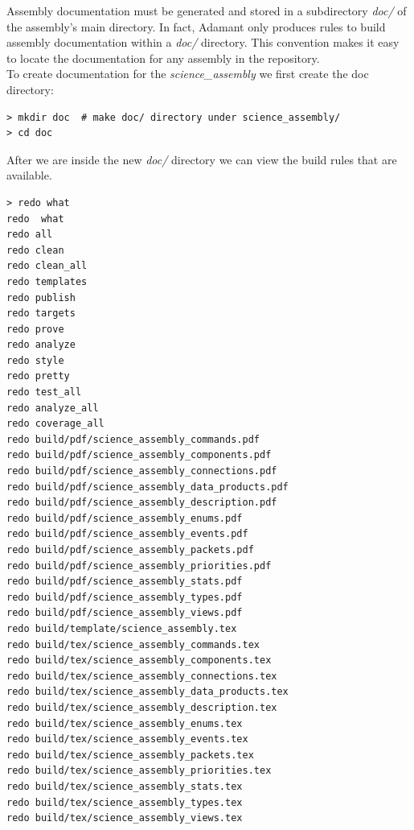 Assembly documentation must be generated and stored in a subdirectory \textit{doc/} of the assembly's main directory. In fact, Adamant only produces rules to build assembly documentation within a \textit{doc/} directory. This convention makes it easy to locate the documentation for any assembly in the repository. \\

To create documentation for the \textit{science\_assembly} we first create the doc directory:

\vspace{5mm} %
\begin{verbatim}
> mkdir doc  # make doc/ directory under science_assembly/
> cd doc
\end{verbatim}
\vspace{5mm} %

After we are inside the new \textit{doc/} directory we can view the build rules that are available.

\vspace{5mm} %
\begin{verbatim}
> redo what
redo  what
redo all
redo clean
redo clean_all
redo templates
redo publish
redo targets
redo prove
redo analyze
redo style
redo pretty
redo test_all
redo analyze_all
redo coverage_all
redo build/pdf/science_assembly_commands.pdf
redo build/pdf/science_assembly_components.pdf
redo build/pdf/science_assembly_connections.pdf
redo build/pdf/science_assembly_data_products.pdf
redo build/pdf/science_assembly_description.pdf
redo build/pdf/science_assembly_enums.pdf
redo build/pdf/science_assembly_events.pdf
redo build/pdf/science_assembly_packets.pdf
redo build/pdf/science_assembly_priorities.pdf
redo build/pdf/science_assembly_stats.pdf
redo build/pdf/science_assembly_types.pdf
redo build/pdf/science_assembly_views.pdf
redo build/template/science_assembly.tex
redo build/tex/science_assembly_commands.tex
redo build/tex/science_assembly_components.tex
redo build/tex/science_assembly_connections.tex
redo build/tex/science_assembly_data_products.tex
redo build/tex/science_assembly_description.tex
redo build/tex/science_assembly_enums.tex
redo build/tex/science_assembly_events.tex
redo build/tex/science_assembly_packets.tex
redo build/tex/science_assembly_priorities.tex
redo build/tex/science_assembly_stats.tex
redo build/tex/science_assembly_types.tex
redo build/tex/science_assembly_views.tex
\end{verbatim}
\vspace{5mm} %

